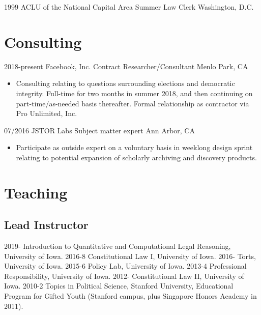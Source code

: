 \documentclass[letterpaper]{moderncv}
\begin{document}
\cventry
{1999}
{ACLU of the National Capital Area}
{Summer Law Clerk}
{Washington, D.C.}
{}
{}


\section{Consulting}

\cventry
{2018-present}
{Facebook, Inc.}
{Contract Researcher/Consultant}
{Menlo Park, CA}
{}
{\begin{itemize}%
	\item Consulting relating to questions surrounding elections and democratic
    integrity. Full-time for two months in summer 2018, and then continuing on
    part-time/as-needed basis thereafter. Formal relationship
    as contractor via Pro Unlimited, Inc.
	\end{itemize}}

\cventry
{07/2016}
{JSTOR Labs}
{Subject matter expert}
{Ann Arbor, CA}
{}
{\begin{itemize}%
	\item Participate as outside expert on a voluntary basis in weeklong design
    sprint relating to potential expansion of scholarly archiving and discovery products.
	\end{itemize}}

\section{Teaching}
\subsection{Lead Instructor}
\cvitem
{2019-}
{Introduction to Quantitative and Computational Legal Reasoning, University of Iowa.}
\vspace{1mm}
\cvitem
{2016-8}
{Constitutional Law I, University of Iowa.}
\vspace{1mm}
\cvitem
{2016-}
{Torts, University of Iowa.}
\vspace{1mm}
\cvitem
{2015-6}
{Policy Lab, University of Iowa.}
\vspace{1mm}
\cvitem
{2013-4}
{Professional Responsibility, University of Iowa.}
\vspace{1mm}
\cvitem
{2012-}
{Constitutional Law II, University of Iowa.}
\vspace{1mm}
\cvitem
{2010-2}
{Topics in Political Science, Stanford University, Educational Program for Gifted Youth (Stanford campus, plus Singapore Honors Academy in 2011).}
\vspace{1mm}
\end{document}
